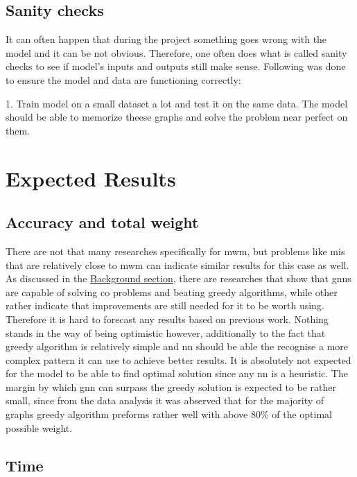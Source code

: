 \subsection{Sanity checks}

It can often happen that during the project something goes wrong with the model and it can be not obvious. Therefore, one often does what is called sanity checks to see if model's inputs and outputs still make sense. Following was done to ensure the model and data are functioning correctly:

1. Train model on a small dataset a lot and test it on the same data. The model should be able to memorize theese graphs and solve the problem near perfect on them.

\section{Expected Results}

\subsection{Accuracy and total weight}

There are not that many researches specifically for \gls{mwm}, but problems like \gls{mis} that are relatively close to \gls{mwm} can indicate similar results for this case as well. As discussed in the \hyperref[sec:background]{Background section}, there are researches that show that \gls{gnn}s are capable of solving \gls{co} problems and beating greedy algorithms, while other rather indicate that improvements are still needed for it to be worth using. Therefore it is hard to forecast any results based on previous work. Nothing stands in the way of being optimistic however, additionally to the fact that greedy algorithm is relatively simple and \gls{nn} should be able the recognise a more complex pattern it can use to achieve better results. It is absolutely not expected for the model to be able to find optimal solution since any \gls{nn} is a heuristic. The margin by which \gls{gnn} can surpass the greedy solution is expected to be rather small, since from the data analysis it was abserved that for the majority of graphs greedy algorithm preforms rather well with above 80\% of the optimal possible weight.

\subsection{Time}


